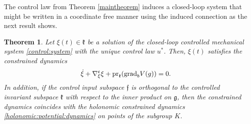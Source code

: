 \documentclass[letterpaper, 10 pt, conference]{ieeeconf}
\newtheorem{theorem}{Theorem}
\newcommand{\g}{\mathfrak{g}}
\newcommand{\grad}{\normalfont{\text{grad}}}
\begin{document}
The control law from Theorem \ref{maintheorem} induces a closed-loop system that might be written in a coordinate free manner using the induced connection as the next result shows.

\begin{theorem}\label{orthogonal:input:thm}
    Let $\xi(t)\in\mathfrak{k}$ be a solution of the closed-loop controlled mechanical system \eqref{control:system} with the unique control law $u^*$. Then, $\xi(t)$ satisfies the constrained dynamics
    $$\dot{\xi} + \nabla^{\mathfrak{c}}_{\xi} \xi + \text{pr}_{\mathfrak{k}}(\grad_{b} V(g)) = 0.$$
    In addition, if the control input subspace $\mathfrak{f}$ is orthogonal to the controlled invariant subspace $\mathfrak{k}$ with respect to the inner product on $\g$, then the constrained dynamics coincides with the holonomic constrained dynamics \eqref{holonomic:potential:dynamics} on points of the subgroup $K$.
\end{theorem}
\end{document}
